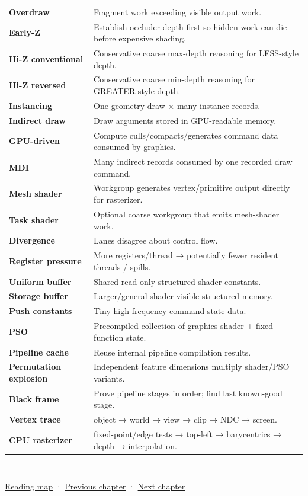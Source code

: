 {\begin{longtable}[]{@{}
  >{\raggedright\arraybackslash}p{}
  >{\raggedright\arraybackslash}p{}@{}}
\textbf{Overdraw} & Fragment work exceeding visible output work. \\
\textbf{Early-Z} & Establish occluder depth first so hidden work can die before expensive shading. \\
\textbf{Hi-Z conventional} & Conservative coarse max-depth reasoning for LESS-style depth. \\
\textbf{Hi-Z reversed} & Conservative coarse min-depth reasoning for GREATER-style depth. \\
\textbf{Instancing} & One geometry draw × many instance records. \\
\textbf{Indirect draw} & Draw arguments stored in GPU-readable memory. \\
\textbf{GPU-driven} & Compute culls/compacts/generates command data consumed by graphics. \\
\textbf{MDI} & Many indirect records consumed by one recorded draw command. \\
\textbf{Mesh shader} & Workgroup generates vertex/primitive output directly for rasterizer. \\
\textbf{Task shader} & Optional coarse workgroup that emits mesh-shader work. \\
\textbf{Divergence} & Lanes disagree about control flow. \\
\textbf{Register pressure} & More registers/thread → potentially fewer resident threads / spills. \\
\textbf{Uniform buffer} & Shared read-only structured shader constants. \\
\textbf{Storage buffer} & Larger/general shader-visible structured memory. \\
\textbf{Push constants} & Tiny high-frequency command-state data. \\
\textbf{PSO} & Precompiled collection of graphics shader + fixed-function state. \\
\textbf{Pipeline cache} & Reuse internal pipeline compilation results. \\
\textbf{Permutation explosion} & Independent feature dimensions multiply shader/PSO variants. \\
\textbf{Black frame} & Prove pipeline stages in order; find last known-good stage. \\
\textbf{Vertex trace} & object → world → view → clip → NDC → screen. \\
\textbf{CPU rasterizer} & fixed-point/edge tests → top-left → barycentrics → depth → interpolation. \\
\end{longtable}
}

\begin{center}\rule{0.5\linewidth}{0.5pt}\end{center}

\begin{center}\rule{0.5\linewidth}{0.5pt}\end{center}

\hyperref[volume-reading-map]{Reading map} · \hyperref[03-visual-computing-i-ch013]{Previous chapter} · \hyperref[03-visual-computing-i-ch015]{Next chapter}
